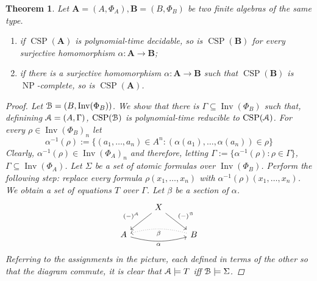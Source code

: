 \documentclass{amsart}
\theoremstyle{plain}
\newtheorem{theorem}{Theorem}[section]
\theoremstyle{definition}
\theoremstyle{remark}
\DeclareMathOperator{\CSP}{CSP}
\DeclareMathOperator{\Inv}{Inv}
\DeclareMathOperator{\NP}{NP}
\begin{document}
\begin{theorem}
    Let $\mathbf{A}=(A, \Phi_A), \mathbf{B}=(B, \Phi_B)$ be two finite algebras of the same type.  
    \begin{enumerate}
        \item if $\CSP(\mathbf{A})$ is polynomial-time decidable, so is $\CSP(\mathbf{B})$ for every surjective homomorphism $\alpha: \mathbf{A} \to \mathbf{B}$; 
        \item if there is a surjective homomorphism $\alpha: \mathbf{A} \to \mathbf{B}$ such that $\CSP(\mathbf{B})$ is $\NP$-complete, so is $\CSP(\mathbf{A})$. 
    \end{enumerate}
    \begin{proof}
        Let $\EuScript{B}=(B, \Inv(\Phi_B))$.
        We show that there is $\Gamma \subseteq \Inv(\Phi_B)$ such that, definining $\EuScript{A}=(A, \Gamma)$, $\CSP(\EuScript{B})$ is polynomial-time reducible to $\CSP(\EuScript{A})$. 
        For every $\rho \in \Inv(\Phi_B)_n$ let 
        \begin{equation*}
            \alpha^{-1}(\rho):=\{(a_1, \ldots, a_n) \in A^n : (\alpha(a_1), \ldots, \alpha(a_n)) \in \rho\}
        \end{equation*}
        Clearly, $\alpha^{-1}(\rho) \in \Inv(\Phi_A)_n$
        and therefore, letting $\Gamma:=\{\alpha^{-1}(\rho) : \rho \in \Gamma\}$, $\Gamma \subseteq \Inv(\Phi_A)$. 
        Let $\Sigma$ be a set of atomic formulas over $\Inv(\Phi_B)$. 
        Perform the following step: replace every formula $\rho(x_1, \ldots, x_n)$ with $\alpha^{-1}(\rho)(x_1, \ldots, x_n)$.       
        We obtain a set of equations $T$ over $\Gamma$.
        Let $\beta$ be a section of $\alpha$.  
        \begin{equation*}
            \begin{tikzcd}
                & X \arrow[dl, "(-)^{\EuScript{A}}", swap] \arrow[dr, "(-)^{\EuScript{B}}"] & \\
                A \arrow[rr, bend right=15, "\alpha", swap] & & B \arrow[ll, bend right=15, dotted, "\beta"]
            \end{tikzcd}
        \end{equation*}
        Referring to the assignments in the picture, each defined in terms of the other so that the diagram commute, 
        it is clear that $\EuScript{A} \models T$ iff $\EuScript{B} \models \Sigma$. 
    \end{proof}
\end{theorem}
\end{document}
